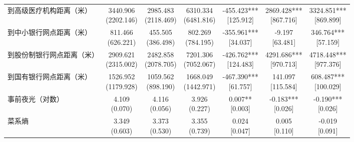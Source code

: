 \documentclass[a4paper,12pt]{report}
\begin{document}
\begin{table}[H]
\begin{adjustbox}{width=\textwidth,center}
\begin{tabular}{lcccccc}
到高级医疗机构距离（米） & \makecell{3440.906\\(2202.146)} & \makecell{2985.483\\(2118.469)} & \makecell{6310.334\\(6481.816)} & \makecell{-455.423***\\ {[125.912]}} & \makecell{2869.428***\\ {[867.716]}} & \makecell{3324.851***\\ {[869.899]}} \\
到中小银行网点距离（米） & \makecell{811.466\\(626.221)} & \makecell{455.505\\(386.498)} & \makecell{802.269\\(784.195)} & \makecell{-355.961***\\ {[34.037]}} & \makecell{-9.197\\ {[63.481]}} & \makecell{346.764***\\ {[57.159]}} \\
到股份制银行网点距离（米） & \makecell{2909.621\\(2315.002)} & \makecell{2482.858\\(2078.705)} & \makecell{7201.306\\(7052.067)} & \makecell{-426.762***\\ {[124.483]}} & \makecell{4291.686***\\ {[970.713]}} & \makecell{4718.448***\\ {[977.376]}} \\
到国有银行网点距离（米） & \makecell{1526.952\\(1179.928)} & \makecell{1059.562\\(898.190)} & \makecell{1668.049\\(1442.971)} & \makecell{-467.390***\\ {[61.757]}} & \makecell{141.097\\ {[115.584]}} & \makecell{608.487***\\ {[100.029]}} \\
事前夜光（对数） & \makecell{4.109\\(0.070)} & \makecell{4.116\\(0.056)} & \makecell{3.926\\(0.227)} & \makecell{0.007**\\ {[0.003]}} & \makecell{-0.183***\\ {[0.026]}} & \makecell{-0.190***\\ {[0.026]}} \\
菜系熵 & \makecell{3.349\\(0.603)} & \makecell{3.373\\(0.530)} & \makecell{3.355\\(0.739)} & \makecell{0.024\\ {[0.047]}} & \makecell{0.005\\ {[0.110]}} & \makecell{-0.019\\ {[0.091]}} \\

\end{tabular}
\end{adjustbox}
\end{table}
\end{document}
